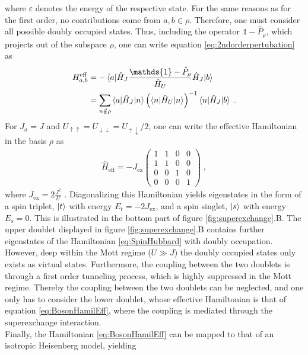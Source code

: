 where $\varepsilon$ denotes the energy of the respective state. For the same reasons as for the first order, no contributions come from $a,b \in \rho$. Therefore, one must consider all possible doubly occupied states. Thus, including the operator $\mathds{1} - \hat{P}_{\rho}$, which projects out of the subspace $\rho$, one can write equation \eqref{eq:2ndorderpertubation} as
\begin{align}
	H_{a,b}^{\mathrm{eff}} &=  - \braket{a|\hat{H}_J \frac{\mathds{1} - \hat{P}_{\rho}}{\hat{H}_U} \hat{H}_J|b} \nonumber \\
	&= \sum_{n \notin \rho} \braket{a|\hat{H}_J|n} \left( \braket{n |\hat{H}_U | n} \right)^{-1} \braket{n|\hat{H}_J|b} \; .
\end{align}
For $J_{\sigma} = J $ and $U_{\uparrow\uparrow} = U_{\downarrow\downarrow} = U_{\uparrow\downarrow}/2$, one can write the effective Hamiltonian in the basis $\rho$ as
\begin{align}
\hat{H}_{\mathrm{eff}} = -J_{\mathrm{ex}} \begin{pmatrix}
           1 & 1 & 0 & 0 \\
           1 & 1 & 0 & 0 \\
           0 & 0 & 1 & 0 \\
           0 & 0 & 0 & 1 
         \end{pmatrix} \; , \label{eq:BosonHamilEff}
\end{align}
where $J_{\mathrm{ex}} = 2 \frac{J^2}{U}$ \cite{Duan2003}. Diagonalizing this Hamiltonian yields eigenstates in the form of a spin triplet, $\ket{t}$ with energy $E_t = -2 J_{\mathrm{ex}}$, and a spin singlet, $\ket{s}$ with energy $E_s = 0$. This is illustrated in the bottom part of figure \ref{fig:superexchange}.B. The upper doublet displayed in figure \ref{fig:superexchange}.B contains further eigenstates of the Hamiltonian \eqref{eq:SpinHubbard} with doubly occupation. However, deep within the Mott regime ($U \gg J$) the doubly occupied states only exists as virtual states. Furthermore, the coupling between the two doublets is through a first order tunneling process, which is highly suppressed in the Mott regime. Thereby the coupling between the two doublets can be neglected, and one only has to consider the lower doublet, whose effective Hamiltonian is that of equation \eqref{eq:BosonHamilEff}, where the coupling is mediated through the superexchange interaction.\\
Finally, the Hamiltonian \eqref{eq:BosonHamilEff} can be mapped to that of an isotropic Heisenberg model, yielding \cite{Trotzky2008}
